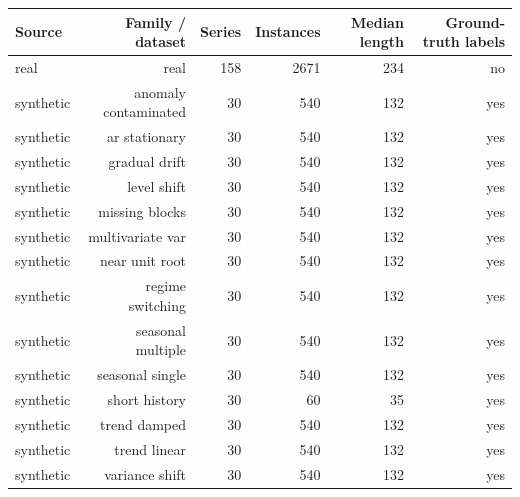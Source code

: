 \begin{tabular}{lrrrrr}
\toprule
Source & Family / dataset & Series & Instances & Median length & Ground-truth labels \\
\midrule
real & real & 158 & 2671 & 234 & no \\
synthetic & anomaly contaminated & 30 & 540 & 132 & yes \\
synthetic & ar stationary & 30 & 540 & 132 & yes \\
synthetic & gradual drift & 30 & 540 & 132 & yes \\
synthetic & level shift & 30 & 540 & 132 & yes \\
synthetic & missing blocks & 30 & 540 & 132 & yes \\
synthetic & multivariate var & 30 & 540 & 132 & yes \\
synthetic & near unit root & 30 & 540 & 132 & yes \\
synthetic & regime switching & 30 & 540 & 132 & yes \\
synthetic & seasonal multiple & 30 & 540 & 132 & yes \\
synthetic & seasonal single & 30 & 540 & 132 & yes \\
synthetic & short history & 30 & 60 & 35 & yes \\
synthetic & trend damped & 30 & 540 & 132 & yes \\
synthetic & trend linear & 30 & 540 & 132 & yes \\
synthetic & variance shift & 30 & 540 & 132 & yes \\
\bottomrule
\end{tabular}
